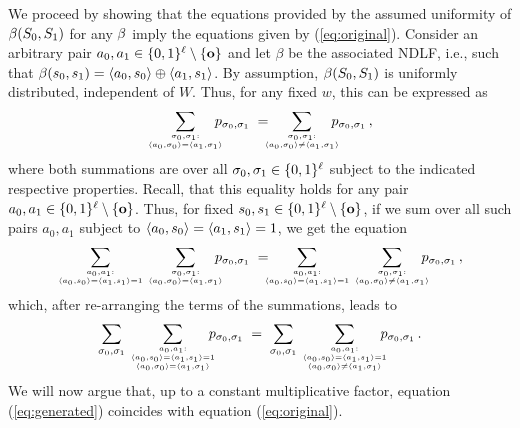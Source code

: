 
We proceed by showing that the equations provided by the assumed
uniformity of $\beta(S_0,S_1)$ for any $\beta$ imply the equations given
by (\ref{eq:original}). Consider an arbitrary pair $a_0,a_1 \in
\{0,1\}^{\ell} \setminus{\{\text{\boldmath${\bf o}$}\}}$ and let $\beta$ be the
associated NDLF, i.e., such that $\beta(s_0,s_1) = \langle a_0,s_0\rangle \oplus
\langle a_1,s_1\rangle$.  By assumption, $\beta(S_0,S_1)$ is uniformly
distributed, independent of $W$. Thus, for any fixed $w$, this can be
expressed as
\begin{equation}\label{eq:linear}
\sum_{\sigma_0,\sigma_1: \atop \ip{a_0,\sigma_0} = \ip{a_1,\sigma_1}}\!\!\!\!\! p_{\sigma_0,\sigma_1}\; = \!\!\!\!\sum_{\sigma_0,\sigma_1: \atop \ip{a_0,\sigma_0} \neq \ip{a_1,\sigma_1}}\!\!\!\!\! p_{\sigma_0,\sigma_1} \, ,
\end{equation}
where both summations are over all $\sigma_0,\sigma_1 \in
\{0,1\}^{\ell}$ subject to the indicated respective properties.
Recall, that this equality holds for any pair $a_0,a_1 \in
\{0,1\}^{\ell} \setminus{\{\text{\boldmath${\bf o}$}\}}$. Thus, for fixed $s_0,s_1 \in
\{0,1\}^{\ell} \setminus \{\text{\boldmath${\bf o}$}\}$, if we sum over all such
pairs $a_0,a_1$ subject to $\langle a_0,s_0\rangle = \langle a_1,s_1\rangle = 1$, we get
the equation
$$
\sum_{a_0,a_1: \atop \ip{a_0,s_0} = \ip{a_1,s_1} = 1}
\sum_{\sigma_0,\sigma_1: \atop \ip{a_0,\sigma_0} =
  \ip{a_1,\sigma_1}}\!\!\!\!\! p_{\sigma_0,\sigma_1}\; =
\!\!\!\!\sum_{a_0,a_1: \atop \ip{a_0,s_0} = \ip{a_1,s_1} = 1}
\sum_{\sigma_0,\sigma_1: \atop \ip{a_0,\sigma_0} \neq
  \ip{a_1,\sigma_1}}\!\!\!\!\! p_{\sigma_0,\sigma_1} \, ,
$$
which, after re-arranging the terms of the summations, leads to
\begin{equation}\label{eq:generated}
\sum_{\sigma_0,\sigma_1}
\sum_{a_0,a_1: \atop {\ip{a_0,s_0} = \ip{a_1,s_1} = 1 \atop \ip{a_0,\sigma_0} = \ip{a_1,\sigma_1}}}\!\!\!\!\! p_{\sigma_0,\sigma_1}\; = \;
\sum_{\sigma_0,\sigma_1}
\sum_{a_0,a_1: \atop {\ip{a_0,s_0} = \ip{a_1,s_1} = 1 \atop \ip{a_0,\sigma_0} \neq \ip{a_1,\sigma_1}}}\!\!\!\!\! p_{\sigma_0,\sigma_1} \, .
\end{equation}
We will now argue that, up to a constant multiplicative
factor, equation (\ref{eq:generated}) coincides with equation
(\ref{eq:original}).

